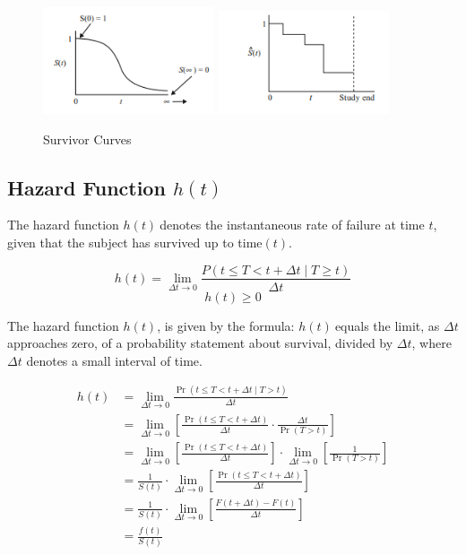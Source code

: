 \documentclass[doublespacing]{report} [12px]%
\begin{document}
\begin{figure}[H]
    \centering
    \includegraphics[width=0.45\textwidth]{Figure 3/3.31.png}
    \hfill
    \includegraphics[width=0.45\textwidth]{Figure 3/3.32.png}
    \caption{Survivor Curves}
    \label{Figure 3.3}
\end{figure}

\subsection{\texorpdfstring{Hazard Function \( h(t) \)}{Hazard Function h(t)}}

The hazard function \( h(t)\ \)denotes the instantaneous rate of failure at time \(t\), given that the subject has survived up to time\( (t).\)

\begin{equation}
h(t) = \lim_{\Delta t \to 0} \frac{P(t \le T < t + \Delta t \mid T \geq t)}{\Delta t}
\end{equation}
\begin{equation}
h\left(t\right)\geq0
\end{equation}


The hazard function \( h\left(t\right)\), is given by the formula: \(h\left(t\right)\ \)equals the limit, as \(\Delta t \) approaches zero, of a probability statement about survival, divided by \(\Delta t\), where \(\Delta t\) denotes a small interval of time.

\begin{align}
h(t) &= \lim_{\Delta t \to 0} \frac{\Pr(t \leq T < t + \Delta t \mid T > t)}{\Delta t} \\
&= \lim_{\Delta t \to 0} \left[ \frac{\Pr(t \leq T < t + \Delta t)}{\Delta t} \cdot \frac{\Delta t}{\Pr(T > t)} \right] \\
&= \lim_{\Delta t \to 0} \left[ \frac{\Pr(t \leq T < t + \Delta t)}{\Delta t} \right] \cdot \lim_{\Delta t \to 0} \left[ \frac{1}{\Pr(T > t)} \right] \\
&= \frac{1}{S(t)} \cdot \lim_{\Delta t \to 0} \left[ \frac{\Pr(t \leq T < t + \Delta t)}{\Delta t} \right] \\
&= \frac{1}{S(t)} \cdot \lim_{\Delta t \to 0} \left[ \frac{F(t + \Delta t) - F(t)}{\Delta t} \right] \\
&= \frac{f(t)}{S(t)} \\
\end{align}
\end{document}
